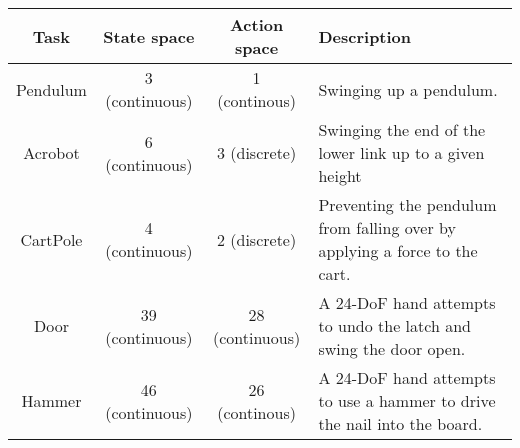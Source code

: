\begin{tabular}{cccp{8cm}}
  \toprule
  \textbf{Task}                                             & \textbf{State space} & \textbf{Action space} & \textbf{Description}                                                       \\
  \midrule
  Pendulum \cite{Task_OpenAIGym}                            & 3 (continuous)       & 1 (continous)         & Swinging up a pendulum.                                                    \\
  Acrobot \cite{Task_OpenAIGym,Task_Acrobot1,Task_Acrobot2} & 6 (continuous)       & 3 (discrete)          & Swinging the end of the lower link up to a given height                    \\
  CartPole \cite{Task_OpenAIGym,Task_CartPole}              & 4 (continuous)       & 2 (discrete)          & Preventing the pendulum from falling over by applying a force to the cart. \\

  Door \cite{Task_Adroit}                                   & 39 (continuous)      & 28 (continuous)       & A 24-DoF hand attempts to undo the latch and swing the door open.          \\
  Hammer \cite{Task_Adroit}                                 & 46 (continuous)      & 26 (continous)        & A 24-DoF hand attempts to use a hammer to drive the nail into the board.   \\
  \bottomrule
\end{tabular}
